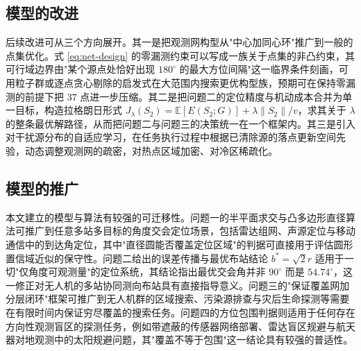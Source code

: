 \documentclass[12pt,a4paper]{ctexart}
\begin{document}
\subsection{模型的改进}

后续改进可从三个方向展开。其一是把观测网构型从"中心加同心环"推广到一般的点集优化。式 \eqref{eq:net-design} 的零漏测约束可以写成一族关于点集的非凸约束，其可行域边界由"某个源点处恰好出现 $180^\circ$ 的最大方位间隔"这一临界条件刻画，可用粒子群或逐点贪心剔除的启发式在大范围内搜索更优构型族，预期可在保持零漏测的前提下把 $37$ 点进一步压缩。其二是把问题二的定位精度与机动成本合并为单一目标，构造拉格朗日形式 $J_\lambda(S_2)=\mathbb E[E(S_2;G)]+\lambda\lVert S_2\rVert/v$，求其关于 $\lambda$ 的整条最优解路径，从而把问题二与问题三的决策统一在一个框架内。其三是引入对干扰源分布的自适应学习，在任务执行过程中根据已清除源的落点更新空间先验，动态调整观测网的疏密，对热点区域加密、对冷区稀疏化。

\subsection{模型的推广}

本文建立的模型与算法有较强的可迁移性。问题一的半平面求交与凸多边形直径算法可推广到任意多站多目标的角度交会定位场景，包括雷达组网、声源定位与移动通信中的到达角定位，其中"直径圆能否覆盖定位区域"的判据可直接用于评估圆形置信域近似的保守性。问题二给出的误差传播与最优布站结论 $b^*=\sqrt2r$ 适用于一切"仅角度可观测量"的定位系统，其结论指出最优交会角并非 $90^\circ$ 而是 $54.74^\circ$，这一修正对无人机的多站协同测向布站具有直接指导意义。问题三的"保证覆盖网加分层闭环"框架可推广到无人机群的区域搜索、污染源排查与灾后生命探测等需要在有限时间内保证穷尽覆盖的搜索任务。问题四的方位包围判据则适用于任何存在方向性观测盲区的探测任务，例如带遮蔽的传感器网络部署、雷达盲区规避与航天器对地观测中的太阳规避问题，其"覆盖不等于包围"这一结论具有较强的普适性。
\end{document}
